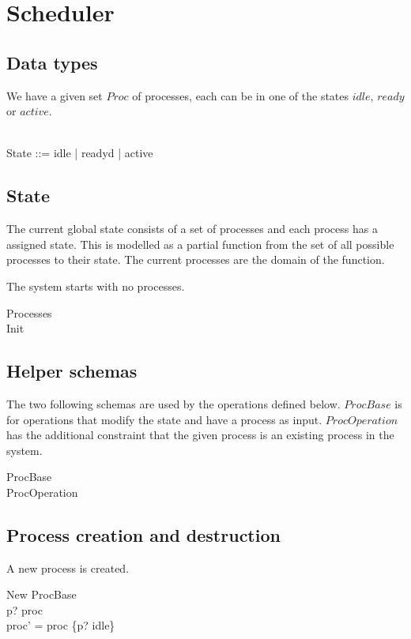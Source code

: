 \documentclass[a4paper]{article}
\begin{document}
\section*{Scheduler}
\subsection*{Data types}
We have a given set $Proc$ of processes, each can be in one of
the states $idle$, $ready$ or $active$.
\begin{zed}
  [Proc]\\
  State ::= idle | readyd | active\\
\end{zed}

\subsection*{State}
The current global state consists of a set of processes and each process
has a assigned state. This is modelled as a partial function from the
set of all possible processes to their state. The current processes
are the domain of the function.

The system starts with no processes.
\begin{zed}
  Processes \\
  Init \\
\end{zed}


\subsection*{Helper schemas}
The two following schemas are used by the operations defined
below. $ProcBase$ is for operations that modify the state and
have a process as input. $ProcOperation$ has the additional
constraint that the given process is an existing process in
the system.
\begin{zed}
  ProcBase \\
  ProcOperation   
\end{zed}


\subsection*{Process creation and destruction}
A new process is created.
\begin{schema}{New}
  ProcBase\\
  \where
  p? \notin \dom proc\\
  proc' = proc \oplus \{p? \mapsto idle\}
\end{schema}
\end{document}

